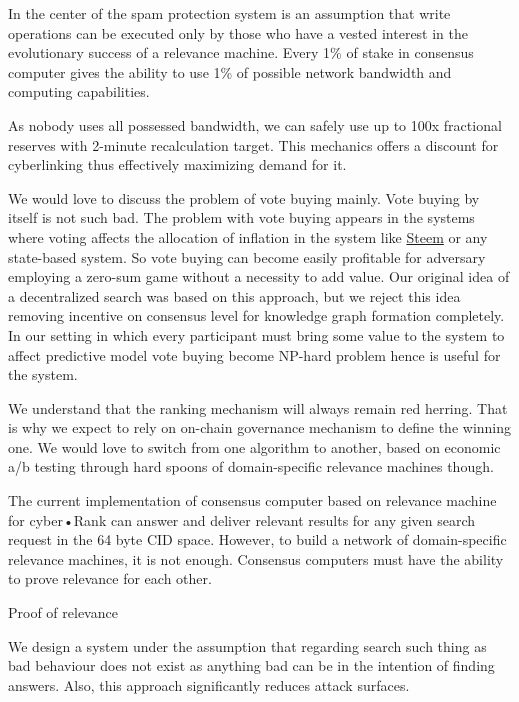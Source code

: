 \documentclass[10pt,oneside]{amsart}
\makeatletter
\def\section{\@startsection{section}{1}%
  \z@{.7\linespacing\@plus\linespacing}{.5\linespacing}%
  {\normalfont\scshape}}%
\makeatother
\begin{document}
In the center of the spam protection system is an assumption that write operations can be executed only by those who have a vested interest in the evolutionary success of a relevance machine. Every 1\% of stake in consensus computer gives the ability to use 1\% of possible network bandwidth and computing capabilities.

As nobody uses all possessed bandwidth, we can safely use up to 100x fractional reserves with 2-minute recalculation target. This mechanics offers a discount for cyberlinking thus effectively maximizing demand for it.

We would love to discuss the problem of vote buying mainly. Vote buying by itself is not such bad. The problem with vote buying appears in the systems where voting affects the allocation of inflation in the system like 
\href{http://ipfs.io/ipfs/QmepU77tqMAHHuiSASUvUnu8f8ENuPF2Kfs97WjLn8vAS3}{Steem}
or any state-based system. So vote buying can become easily profitable for adversary employing a zero-sum game without a necessity to add value. Our original idea of a decentralized search was based on this approach, but we reject this idea removing incentive on consensus level for knowledge graph formation completely. In our setting in which every participant must bring some value to the system to affect predictive model vote buying become NP-hard problem hence is useful for the system.

We understand that the ranking mechanism will always remain red herring. That is why we expect to rely on on-chain governance mechanism to define the winning one. We would love to switch from one algorithm to another, based on economic a/b testing through hard spoons of domain-specific relevance machines though.  

The current implementation of consensus computer based on relevance machine for cyber•Rank can answer and deliver relevant results for any given search request in the 64 byte CID space. However, to build a network of domain-specific relevance machines, it is not enough. Consensus computers must have the ability to prove relevance for each other.

\section{Proof of relevance}\label{Proof of relevance}

We design a system under the assumption that regarding search such thing as bad behaviour does not exist as anything bad can be in the intention of finding answers. Also, this approach significantly reduces attack surfaces.
\end{document}
